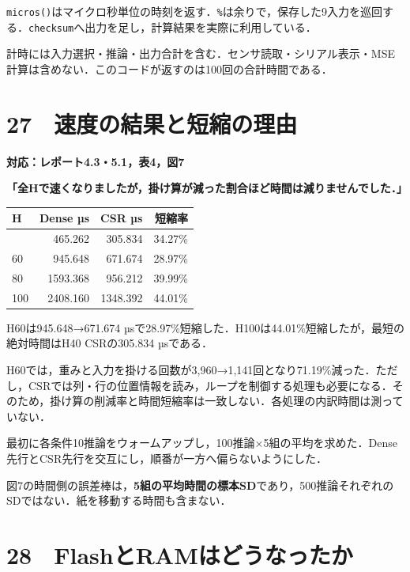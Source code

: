 \documentclass[
  14pt,
  a5paper,
]{extarticle}
\begin{document}
\texttt{micros()}はマイクロ秒単位の時刻を返す．\texttt{\%}は余りで，保存した9入力を巡回する．\texttt{checksum}へ出力を足し，計算結果を実際に利用している．

計時には入力選択・推論・出力合計を含む．センサ読取・シリアル表示・MSE計算は含めない．このコードが返すのは100回の合計時間である．

\newpage

\section{27　速度の結果と短縮の理由}\label{ux901fux5ea6ux306eux7d50ux679cux3068ux77edux7e2eux306eux7406ux7531}

\textbf{対応：レポート4.3・5.1，表4，図7}

\textbf{「全Hで速くなりましたが，掛け算が減った割合ほど時間は減りませんでした．」}

\begin{longtable}[]{@{}lrrr@{}}
\toprule\noalign{}
H & Dense µs & CSR µs & 短縮率 \\
\midrule\noalign{}
\endhead
\bottomrule\noalign{}
\endlastfoot
40 & 465.262 & 305.834 & 34.27\% \\
60 & 945.648 & 671.674 & 28.97\% \\
80 & 1593.368 & 956.212 & 39.99\% \\
100 & 2408.160 & 1348.392 & 44.01\% \\
\end{longtable}

H60は945.648→671.674
µsで28.97\%短縮した．H100は44.01\%短縮したが，最短の絶対時間はH40
CSRの305.834 µsである．

H60では，重みと入力を掛ける回数が3,960→1,141回となり71.19\%減った．ただし，CSRでは列・行の位置情報を読み，ループを制御する処理も必要になる．そのため，掛け算の削減率と時間短縮率は一致しない．各処理の内訳時間は測っていない．

最初に各条件10推論をウォームアップし，100推論×5組の平均を求めた．Dense先行とCSR先行を交互にし，順番が一方へ偏らないようにした．

図7の時間側の誤差棒は，\textbf{5組の平均時間の標本SD}であり，500推論それぞれのSDではない．紙を移動する時間も含まない．

\newpage

\section{28　FlashとRAMはどうなったか}\label{flashux3068ramux306fux3069ux3046ux306aux3063ux305fux304b}
\end{document}
